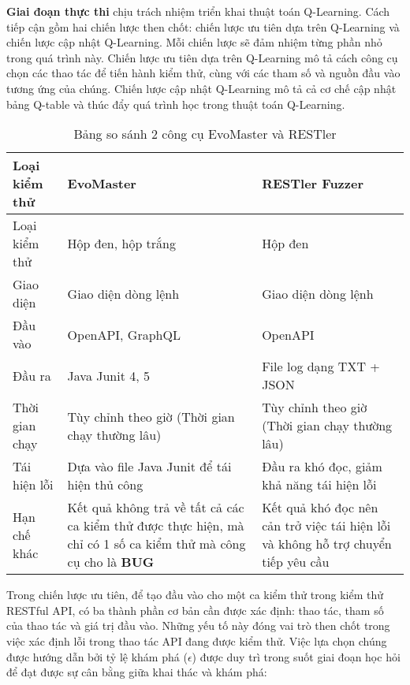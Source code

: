 
\textbf{Giai đoạn thực thi} chịu trách nhiệm triển khai thuật toán Q-Learning. Cách tiếp cận gồm hai chiến lược then chốt: chiến lược ưu tiên dựa trên Q-Learning và chiến lược cập nhật Q-Learning. Mỗi chiến lược sẽ đảm nhiệm từng phần nhỏ trong quá trình này. Chiến lược ưu tiên dựa trên Q-Learning mô tả cách công cụ chọn các thao tác để tiến hành kiểm thử, cùng với các tham số và nguồn đầu vào tương ứng của chúng. Chiến lược cập nhật Q-Learning mô tả cả cơ chế cập nhật bảng Q-table và thúc đẩy quá trình học trong thuật toán Q-Learning.


\begin{table}[h]
\caption{Bảng so sánh 2 công cụ EvoMaster và RESTler}
\label{table:compare2tool}
\begin{tabularx}{\textwidth}{|l|X|X|}
\hline
\textbf{Loại kiểm thử} & \textbf{EvoMaster} & \textbf{RESTler Fuzzer} \\
\hline
Loại kiểm thử & Hộp đen, hộp trắng & Hộp đen \\
\hline
Giao diện & Giao diện dòng lệnh & Giao diện dòng lệnh \\
\hline
Đầu vào & OpenAPI, GraphQL & OpenAPI \\
\hline
Đầu ra & Java Junit 4, 5 & File log dạng TXT + JSON \\
\hline
Thời gian chạy & Tùy chỉnh theo giờ
(Thời gian chạy thường lâu) & Tùy chỉnh theo giờ (Thời gian chạy thường lâu) \\
\hline
Tái hiện lỗi & Dựa vào file Java Junit để tái hiện thủ công & Đầu ra khó đọc, giảm khả năng tái hiện lỗi \\
\hline
Hạn chế khác & Kết quả không trả về tất cả các ca kiểm thử được thực hiện, mà chỉ có 1 số ca kiểm thử mà công cụ cho là \textbf{BUG} & Kết quả khó đọc nên cản trở việc tái hiện lỗi và không hỗ trợ chuyển tiếp yêu cầu \\
\hline
\end{tabularx}
\end{table}



Trong chiến lược ưu tiên, để tạo đầu vào cho một ca kiểm thử trong kiểm thử RESTful API, có ba thành phần cơ bản cần được xác định: thao tác, tham số của thao tác và giá trị đầu vào.
Những yếu tố này đóng vai trò then chốt trong việc xác định lỗi trong thao tác API đang được kiểm thử. Việc lựa chọn chúng được hướng dẫn bởi tỷ lệ khám phá ($\epsilon$) được duy trì trong suốt giai đoạn học hỏi để đạt được sự cân bằng giữa khai thác và khám phá:

